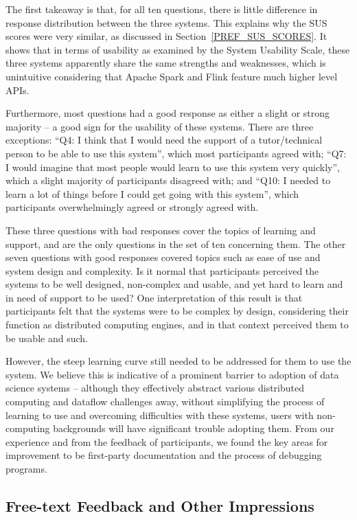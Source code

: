   The first takeaway is that, for all ten questions, there is little difference in response distribution between the three systems. This explains why the SUS scores were very similar, as discussed in Section~\ref{PREF_SUS_SCORES}. It shows that in terms of usability as examined by the System Usability Scale, these three systems apparently share the same strengths and weaknesses, which is unintuitive considering that Apache Spark and Flink feature much higher level APIs.
  
  Furthermore, most questions had a good response as either a slight or strong majority -- a good sign for the usability of these systems. There are three exceptions: ``Q4: I think that I would need the support of a tutor/technical person to be able to use this system'', which most participants agreed with; ``Q7: I would imagine that most people would learn to use this system very quickly'', which a slight majority of participants disagreed with; and ``Q10: I needed to learn a lot of things before I could get going with this system'', which participants overwhelmingly agreed or strongly agreed with.
  
  These three questions with bad responses cover the topics of learning and support, and are the only questions in the set of ten concerning them. The other seven questions with good responses covered topics such as ease of use and system design and complexity. Is it normal that participants perceived the systems to be well designed, non-complex and usable, and yet hard to learn and in need of support to be used? One interpretation of this result is that participants felt that the systems were to be complex by design, considering their function as distributed computing engines, and in that context perceived them to be usable and such.
  
  However, the steep learning curve still needed to be addressed for them to use the system. We believe this is indicative of a prominent barrier to adoption of data science systems -- although they effectively abstract various distributed computing and dataflow challenges away, without simplifying the process of learning to use and overcoming difficulties with these systems, users with non-computing backgrounds will have significant trouble adopting them. From our experience and from the feedback of participants, we found the key areas for improvement to be first-party documentation and the process of debugging programs.


\subsection{Free-text Feedback and Other Impressions}
  
